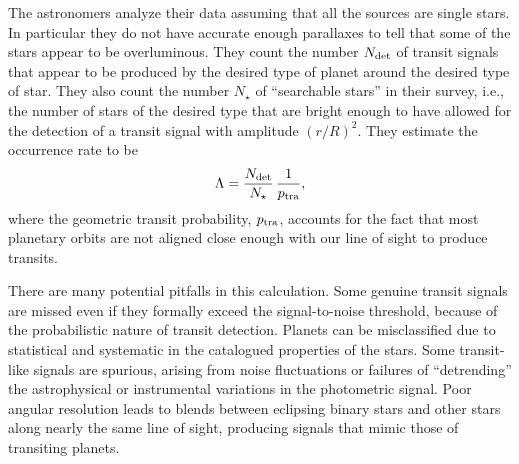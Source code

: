 \documentclass[12pt,modern,trackchanges]{aastex61}
\begin{document}
The astronomers analyze their data assuming that all the sources are
single stars.  In particular they do not have accurate enough
parallaxes to tell that some of the stars appear to be overluminous.
They count the number $N_{\rm det}$ of transit signals that appear to
be produced by the desired type of planet around the desired type of
star.  They also count the number $N_\star$ of ``searchable stars'' in
their survey, i.e., the number of stars of the desired type that are
bright enough to have allowed for the detection of a transit signal
with amplitude $(r/R)^2$.  They estimate the occurrence rate to be
\begin{equation}
  \Lambda = \frac{N_{\rm det}}{N_\star}
                    \, \frac{1}{p_{\rm tra}},
  \label{eq:occ_rate_simple}
\end{equation}
where the geometric transit probability, $p_{\rm tra}$, accounts for
the fact that most planetary orbits are not aligned close enough with
our line of sight to produce transits.

There are many potential pitfalls in this calculation.  Some genuine
transit signals are missed even if they formally exceed the
signal-to-noise threshold, because of the probabilistic nature of
transit detection.  Planets can be misclassified due to statistical
and systematic  in the catalogued 
properties of the stars.  Some
transit-like signals are spurious, arising from noise fluctuations or
failures of ``detrending'' the astrophysical or instrumental
variations in the photometric signal.  Poor angular resolution leads
to blends between eclipsing binary stars and other stars along nearly
the same line of sight, producing signals that mimic those of
transiting planets.
\end{document}
